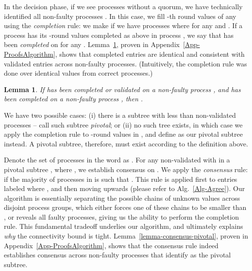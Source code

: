 \documentclass[11pt]{article}
\newtheorem{lemma}[theorem]{Lemma}
\begin{document}
In the decision phase,
if we see  processes without a quorum,
we have technically identified all non-faulty processes .
In this case,
we fill -th round values of any  using the \emph{completion} rule:
we make  if we have  processes 
where 
for any  and .
If a process  has its -round values
completed as above in process ,
we say that  has been \emph{completed} on  for any .
Lemma~\ref{lemma-validated-completed},
proven in Appendix~\ref{App-ProofsAlgorithm},
shows that completed entries are identical and consistent
with validated entries across non-faulty processes.
(Intuitively,
the completion rule was done over identical values from correct processes.)
\begin{lemma}
\label{lemma-validated-completed}
If  has been completed or validated on a non-faulty process ,
and  has been completed on a non-faulty process ,
then .
\end{lemma}


We have two possible cases:
(i) there is a subtree  with less than 
non-validated processes --
call such subtree \emph{pivotal};
or (ii) no such tree exists,
in which case we apply the completion rule to -round values in ,
and define  as our pivotal subtree instead.
A pivotal subtree, therefore, must exist according to the definition above.


Denote the set of processes in the word  as .
For any non-validated  with  in a pivotal subtree ,
where ,
we establish consensus on .
We apply the \emph{consensus} rule:
 if the majority of processes in 
is such that .
This rule is applied first to entries labeled  where ,
and then moving upwards (please refer to Alg.~\ref{Alg-Agree}).
Our algorithm is essentially
separating the possible chains of unknown values across disjoint process groups,
which either forces one of these chains to be smaller than ,
or reveals all faulty processes,
giving us the ability to perform the completion rule.
This fundamental tradeoff underlies our algorithm,
and ultimately explains \emph{why} the  connectivity bound is tight.
Lemma~\ref{lemma-consensus-pivotal},
proven in Appendix~\ref{App-ProofsAlgorithm},
shows that the consensus rule indeed establishes consensus
across non-faulty processes that identify  as the pivotal subtree.

\begin{comment}
The decision is based on values resulting from consensus on ,
taking the minimum element appearing at least  times.
Define the multiset 
after applying the consensus rule,
and let .
Lemma~\ref{lemma-decision-pivotal},
proven in Appendix~\ref{App-ProofsAlgorithm},
shows that,
since ,
such value exists,
and we can decide on a value that has been necessarily input by a non-faulty process.
\end{comment}
\end{document}
